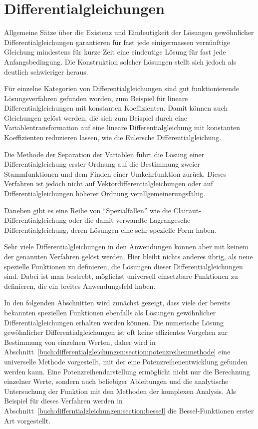 %
%
%
\chapter{Differentialgleichungen
\label{buch:chapter:differential}}
\rhead{}
Allgemeine Sätze über die Existenz und Eindeutigkeit der Lösungen
gewöhnlicher Differentialgleichungen garantieren für fast jede
einigermassen vernünftige Gleichung mindestens für kurze Zeit
eine eindeutige Lösung für fast jede Anfangsbedingung.
Die Konstruktion solcher Lösungen stellt sich jedoch als deutlich
schwieriger heraus.

Für einzelne Kategorien von Differentialgleichungen sind 
gut funktionierende Lösungsverfahren gefunden worden, zum Beispiel
für lineare Differentialgleichungen mit konstanten Koeffizienten.
Damit können auch Gleichungen gelöst werden, die sich zum Beispiel
durch eine Variablentransformation auf eine lineare Differentialgleichung
mit konstanten Koeffizienten reduzieren lassen, wie die Eulersche
Differentialgleichung.

Die Methode der Separation der Variablen führt die Lösung
einer Differentialgleichung erster Ordnung auf die Bestimmung 
zweier Stammfunktionen und dem Finden einer Umkehrfunktion zurück.
Dieses Verfahren ist jedoch nicht auf Vektordifferentialgleichungen
oder auf Differentialgleichungen höherer Ordnung verallgemeinerungsfähig.

Daneben gibt es eine Reihe von ``Spezialfällen'' wie die
Clairaut-Differentialgleichung oder die damit verwandte
Lagrangesche Differentialgleichung, deren Lösungen eine sehr
spezielle Form haben.

Sehr viele Differentialgleichungen in den Anwendungen können aber
mit keinem der genannten Verfahren gelöst werden.
Hier bleibt nichts anderes übrig, als neue spezielle Funktionen
zu definieren, die Lösungen dieser Differentialgleichungen sind.
Dabei ist man bestrebt, möglichst universell einsetzbare Funktionen
zu definieren, die ein breites Anwendungsfeld haben.

In den folgenden Abschnitten wird zunächst gezeigt, dass viele
der bereits bekannten speziellen Funktionen ebenfalls als Lösungen
gewöhnlicher Differentialgleichungen erhalten werden können.
Die numerische Lösung gewöhnlicher Differentialgleichungen ist
oft keine effizientes Vorgehen zur Bestimmung von einzelnen Werten,
daher wird in
Abschnitt~\ref{buch:differentialgleichungen:section:potenzreihenmethode}
eine universelle Methode vorgestellt, mit der eine Potenzreihenentwicklung
gefunden werden kann.
Eine Potenzreihendarstellung ermöglicht nicht nur die Berechnung
einzelner Werte, sondern auch beliebiger Ableitungen und die
analytische Untersuchung der Funktion mit den Methoden der
komplexen Analysis.
Als Beispiel für dieses Verfahren werden in
Abschnitt~\ref{buch:differntialgleichungen:section:bessel}
die Bessel-Funktionen erster Art vorgestellt.

